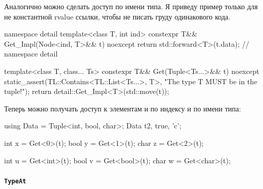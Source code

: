 Аналогично можно сделать доступ по имени типа.
Я приведу пример только для не константной rvalue ссылки, чтобы не писать груду одинакового кода.
\begin{cppcode}
namespace detail {
template<class T, int ind>
constexpr T&& Get_Impl(Node<ind, T>&& t) noexcept {
  return std::forward<T>(t.data);
}
} // namespace detail

template<class T, class... Ts>
constexpr T&& Get(Tuple<Ts...>&& t) noexcept {
  static_assert(TL::Contains<TL::List<Ts...>, T>, "The type T MUST be in the tuple!");
  return detail::Get_Impl<T>(std::move(t));
}
\end{cppcode}
Теперь можно получать доступ к элементам и по индексу и по имени типа:
\begin{cppcode}
using Data = Tuple<int, bool, char>;
Data t{2, true, 'c'};

int  x = Get<0>(t);
bool y = Get<1>(t);
char z = Get<2>(t);

int  u = Get<int>(t);
bool v = Get<bool>(t);
char w = Get<char>(t);
\end{cppcode}

\paragraph{\texttt{TypeAt}}

